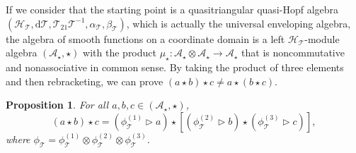 \documentclass[reqno]{amsart}
\newtheorem{proposition}[formula]{Proposition}
\theoremstyle{definition}
\theoremstyle{remark}
\begin{document}
If we consider that the starting point is a quasitriangular quasi-Hopf algebra $\left(\mathscr{H}_\mathcal{T},\text{d}\mathcal{T},\mathcal{T}_{21}\mathcal{T}^{-1},\alpha_\mathcal{T},\beta_\mathcal{T}\right)$, which is actually the universal enveloping algebra, the algebra of smooth functions on a coordinate domain is a left $\mathscr{H}_\mathcal{T}$-module algebra $\left(\mathscr{A}_\star,\star\right)$ with the product $\mu_\star: \mathscr{A}_\star \otimes \mathscr{A}_\star \longrightarrow \mathscr{A}_\star$ that is noncommutative and nonassociative in common sense. By taking the product of three elements and then rebracketing, we can prove $(a\star b)\star c \neq a\star (b\star c)$.

\begin{proposition}
    For all $a,b,c \in (\mathscr{A}_\star,\star)$,
    \begin{equation}\label{nonassociative product}
        (a\star b)\star c = \left(\phi_\mathcal{T}^{(1)} \triangleright a\right) \star \left[\left(\phi_\mathcal{T}^{(2)} \triangleright b\right) \star\left(\phi_\mathcal{T}^{(3)} \triangleright c\right) \right],
    \end{equation}
    where $\phi_\mathcal{T} = \phi_\mathcal{T}^{(1)}\otimes \phi_\mathcal{T}^{(2)}\otimes \phi_\mathcal{T}^{(3)}$.
\end{proposition}
\end{document}
